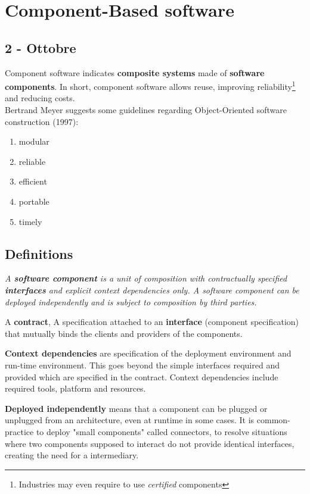 \chapter{Component-Based software}
\section*{2 - Ottobre}
Component software indicates \textbf{composite systems} made of \textbf{software components}.
In short, component software allows reuse, improving reliability\footnote{Industries may even require to use \textit{certified} components} and reducing costs.\\
Bertrand Meyer suggests some guidelines regarding Object-Oriented software construction (1997):
\begin{enumerate}[noitemsep]
    \item modular
    \item reliable
    \item efficient
    \item portable
    \item timely
\end{enumerate}

\section{Definitions}
{\itshape A \textbf{software component} is a unit of composition with
contractually specified \textbf{interfaces} and explicit context
dependencies only. A software component can be
deployed independently and is subject to
composition by third parties.}

A \textbf{contract}, A specification attached to an \textbf{interface} (component specification) that
mutually binds the clients and providers of the components.

\textbf{Context dependencies} are specification of the deployment
environment and run-time environment.
This goes beyond the simple interfaces required and provided which are specified in the contract.
Context dependencies include required tools, platform and resources.

\textbf{Deployed independently} means that a component can be plugged or unplugged from an architecture, even at runtime in some cases.
It is common-practice to deploy "small components" called connectors,
to resolve situations where two components supposed to interact do not provide identical interfaces,
creating the need for a intermediary.

